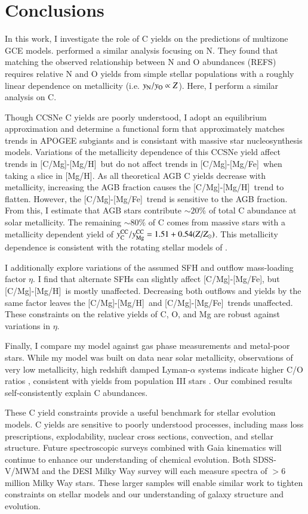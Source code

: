 \documentclass[12pt,oneside]{report}
\newcommand{\caah}{[C/Mg]-[Mg/H]}
\newcommand{\caafe}{[C/Mg]-[Mg/Fe]}
\newcommand{\Ycc}{\ensuremath{y_{\rm C}^{\rm CC}}}
\newcommand{\Yoc}{\ensuremath{y_{\rm Mg}^{\rm CC}}}
\newcommand{\about}[1]{${\sim} #1$}
\begin{document}
\chapter{Conclusions}

In this work, I investigate the role of C yields on the predictions of multizone GCE models. \citet{james+23} performed a similar analysis focusing on N. They found that matching the observed relationship between N and O abundances (REFS) requires relative N and O yields from simple stellar populations with a roughly linear dependence on metallicity (i.e. $y_{\rm N}/y_{\rm O} \propto Z$). 
Here, I perform a similar analysis on C. 

Though CCSNe C yields are poorly understood, I adopt an equilibrium approximation and determine a functional form that approximately matches trends in APOGEE subgiants and is consistant with massive star nucleosynthesis models. Variations of the metallicity dependence of this CCSNe yield affect trends in \caah~but do not affect trends in \caafe\ when taking a slice in [Mg/H]. As all theoretical AGB C yields decrease with metallicity, increasing the AGB fraction causes the \caah\ trend to flatten. However, the \caafe\ trend is sensitive to the AGB fraction. 
From this, I estimate that AGB stars contribute \about{20\%} of total C abundance at solar metallicity. The remaining \about{80\%} of C comes from massive stars with a metallicity dependent yield of $\Ycc/\Yoc=1.51 + 0.54 (Z/Z_\odot)$. 
This metallicity dependence is consistent with the rotating stellar models of \citet{LC18}. 
 

I additionally explore variations of the assumed SFH and outflow mass-loading factor $\eta$. I find that alternate SFHs can slightly affect \caafe, but \caah~is mostly unaffected. Decreasing both outflows and yields by the same factor leaves the \caah~and \caafe~trends unaffected. These constraints on the relative yields of C, O, and Mg are robust against variations in $\eta$.

Finally, I compare my model against gas phase measurements and metal-poor stars. While my model was built on data near solar metallicity, observations of very low metallicity, high redshift damped Lyman-$\alpha$ systems indicate higher C/O ratios \citep{cooke+17}, consistent with yields from population III stars \citep[e.g.][]{hirschi07}. Our combined results self-consistently explain C abundances. 

These C yield constraints provide a useful benchmark for stellar evolution models. C yields are sensitive to poorly understood processes, including mass loss prescriptions, explodability, nuclear cross sections, convection, and stellar structure. Future spectroscopic surveys combined with Gaia kinematics \citep{gaia} will continue to enhance our understanding of chemical evolution. Both SDSS-V/MWM \citep{sdssv} and the DESI Milky Way survey \citep{desi, desi:mw} will each measure spectra of $>6$ million Milky Way stars. These larger samples will enable similar work to tighten constraints on stellar models and our understanding of galaxy structure and evolution.
\end{document}
